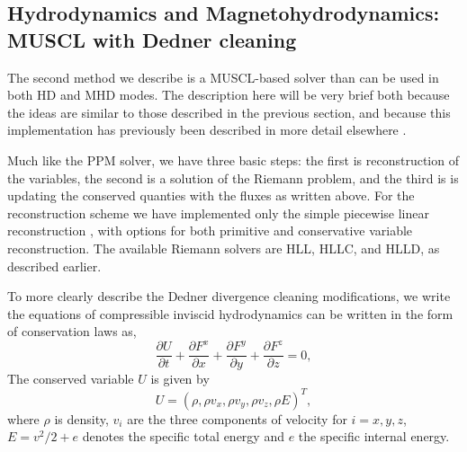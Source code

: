 \subsection{Hydrodynamics and Magnetohydrodynamics: MUSCL with Dedner cleaning}
\label{sec.num.hydro-muscl}

The second method we describe is a MUSCL-based solver than can be used in both HD and MHD modes.  The description here will be very brief both because the ideas are similar to those described in the previous section, and because this implementation has previously
been described in more detail elsewhere \citep{WangAbelZhang08, WangAbel09}.

Much like the PPM solver, we have three basic steps: the first is
reconstruction of the variables, the second is a solution of the
Riemann problem, and the third is is updating the conserved quanties
with the fluxes as written above.
For the reconstruction scheme we have implemented only the simple
piecewise linear reconstruction \citep{1979JCoPh..32..101V, 1985JCoPh..59..264C},
with options for both primitive and conservative variable reconstruction.
The available Riemann solvers are HLL, HLLC, and HLLD, as described earlier.

To more clearly describe the Dedner divergence cleaning modifications, we write the equations of compressible inviscid hydrodynamics can be written in the form of conservation laws as,
\begin{equation}
 \frac{\partial{U}}{\partial{t}} +
 \frac{\partial{F^x}}{\partial{x}} + \frac{\partial{F^y}}{\partial{y}} + \frac{\partial{F^z}}{\partial{z}}= 0, \label{hydro}
\end{equation}
The conserved variable $U$ is given by
\begin{equation}
 U = (\rho, \rho v_x, \rho v_y, \rho v_z, \rho E)^{T},
\end{equation} 
where $\rho$ is density, $v_i$ are the three components of velocity
for $i={x,y,z}$, $E=v^2/2 + e$ denotes the specific total energy and $e$ the
specific internal energy.


